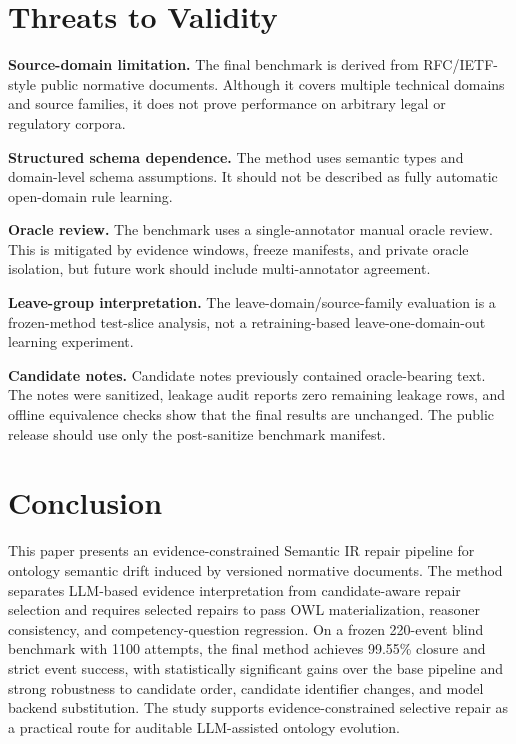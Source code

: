 \documentclass[11pt]{article}
\begin{document}
\section{Threats to Validity}

\textbf{Source-domain limitation.} The final benchmark is derived from RFC/IETF-style public normative documents. Although it covers multiple technical domains and source families, it does not prove performance on arbitrary legal or regulatory corpora.

\textbf{Structured schema dependence.} The method uses semantic types and domain-level schema assumptions. It should not be described as fully automatic open-domain rule learning.

\textbf{Oracle review.} The benchmark uses a single-annotator manual oracle review. This is mitigated by evidence windows, freeze manifests, and private oracle isolation, but future work should include multi-annotator agreement.

\textbf{Leave-group interpretation.} The leave-domain/source-family evaluation is a frozen-method test-slice analysis, not a retraining-based leave-one-domain-out learning experiment.

\textbf{Candidate notes.} Candidate notes previously contained oracle-bearing text. The notes were sanitized, leakage audit reports zero remaining leakage rows, and offline equivalence checks show that the final results are unchanged. The public release should use only the post-sanitize benchmark manifest.

\section{Conclusion}

This paper presents an evidence-constrained Semantic IR repair pipeline for ontology semantic drift induced by versioned normative documents. The method separates LLM-based evidence interpretation from candidate-aware repair selection and requires selected repairs to pass OWL materialization, reasoner consistency, and competency-question regression. On a frozen 220-event blind benchmark with 1100 attempts, the final method achieves 99.55\% closure and strict event success, with statistically significant gains over the base pipeline and strong robustness to candidate order, candidate identifier changes, and model backend substitution. The study supports evidence-constrained selective repair as a practical route for auditable LLM-assisted ontology evolution.



\end{document}
